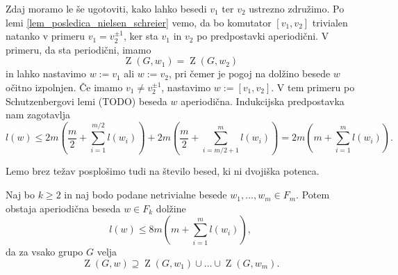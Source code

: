 \documentclass[mat1, tisk]{fmfdelo}
\numberwithin{equation}{section}  %
\begin{document}
\begin{dokaz}
        Zdaj moramo le še ugotoviti, kako lahko besedi $v_1$ ter $v_2$ ustrezno združimo. Po lemi \ref{lem_posledica_nielsen_schreier} vemo, da bo komutator $[v_1, v_2]$ trivialen natanko v primeru $v_1 = v_2^{\pm 1}$, ker sta $v_1$ in $v_2$ po predpostavki aperiodični. V primeru, da sta periodični, imamo \begin{equation*}
        \operatorname{Z}(G, w_1) = \operatorname{Z}(G, w_2)
        \end{equation*}  
         in lahko nastavimo $w := v_1$ ali $w := v_2$, pri čemer je pogoj na dolžino besede $w$ očitno izpolnjen. Če imamo $v_1 \neq v_2^{\pm 1}$, nastavimo $w := [v_1, v_2]$. V tem primeru po Schutzenbergovi lemi (TODO) beseda $w$ aperiodična. Indukcijska predpostavka nam zagotavlja 
         \begin{equation*}
         l(w) \le 2m  \left(\frac{m}{2} + \sum_{i=1}^{m / 2} l(w_{i}) \right) + 2m \left(\frac{m}{2} + \sum_{i= m / 2 + 1}^{m} l(w_{i}) \right) = 2m \left( m + \sum_{i = 1}^{m} l(w_{i}) \right).
         \end{equation*}
    \end{dokaz}

Lemo brez težav posplošimo tudi na število besed, ki ni dvojiška potenca.
\begin{lema}
\label{lem_komutatorska_lema_splosna}
Naj bo $k \ge 2$ in naj bodo podane netrivialne besede $w_1, \ldots, w_{m} \in  F_m$. Potem obstaja aperiodična beseda $w \in F_k$ dolžine \begin{equation*}
l(w) \le 8m \left(m +  \sum_{i = 1}^{m} l(w_{i}) \right),
\end{equation*}  
da za vsako grupo $G$ velja \begin{equation*}
\operatorname{Z}(G, w) \supseteq \operatorname{Z}(G, w_1) \cup \ldots \cup  \operatorname{Z}(G, w_{m}).
\end{equation*}    
\end{lema}

\end{document}
